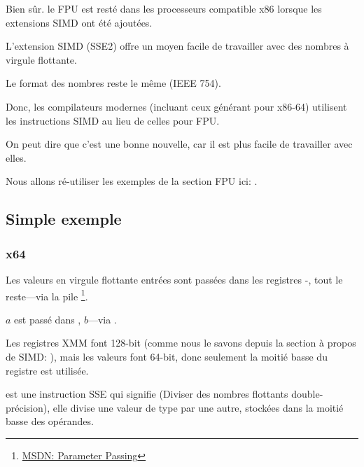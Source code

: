 
\label{floating_SIMD}

Bien sûr. le \ac{FPU} est resté dans les processeurs compatible x86 lorsque les extensions
\ac{SIMD} ont été ajoutées.

L'extension \ac{SIMD} (SSE2) offre un moyen facile de travailler avec des nombres
à virgule flottante.

Le format des nombres reste le même (IEEE 754).

Donc, les compilateurs modernes (incluant ceux générant pour x86-64) utilisent les
instructions \ac{SIMD} au lieu de celles pour FPU.

On peut dire que c'est une bonne nouvelle, car il est plus facile de travailler avec
elles.

Nous allons ré-utiliser les exemples de la section FPU ici: .

\subsection{Simple exemple}



\subsubsection{x64}



Les valeurs en virgule flottante entrées sont passées dans les registres -,
tout le reste---via la pile
\footnote{\href{http://msdn.microsoft.com/en-us/library/zthk2dkh.aspx}{MSDN: Parameter Passing}}.

$a$ est passé dans , $b$---via .

Les registres XMM font 128-bit (comme nous le savons depuis la section à propos de
\ac{SIMD}: ), mais les valeurs \Tdouble font 64-bit, donc seulement
la moitié basse du registre est utilisée.

 est une instruction SSE qui signifie  (Diviser des nombres flottants double-précision), elle divise
une valeur de type \Tdouble par une autre, stockées dans la moitié basse des opérandes.

